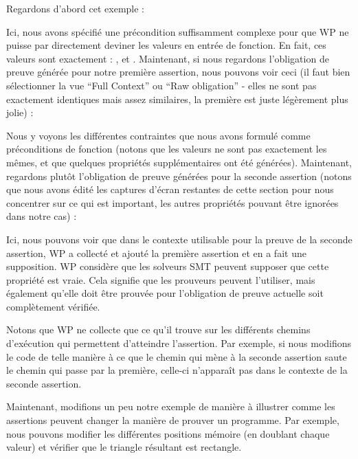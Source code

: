 


Regardons d'abord cet exemple :





Ici, nous avons spécifié une précondition suffisamment complexe pour que WP ne
puisse par directement deviner les valeurs en entrée de fonction. En fait, ces
valeurs sont exactement : ,  et
. Maintenant, si nous regardons l'obligation de preuve générée
pour notre première assertion, nous pouvons voir ceci (il faut bien sélectionner
la vue ``Full Context'' ou ``Raw obligation'' - elles ne sont pas exactement
identiques mais assez similaires, la première est juste légèrement plus jolie) :




Nous y voyons les différentes contraintes que nous avons formulé comme préconditions
de fonction (notons que les valeurs ne sont pas exactement les mêmes, et que quelques
propriétés supplémentaires ont été générées). Maintenant, regardons plutôt
l'obligation de preuve générées pour la seconde assertion (notons que nous avons
édité les captures d'écran restantes de cette section pour nous concentrer sur ce
qui est important, les autres propriétés pouvant être ignorées dans notre cas) :




Ici, nous pouvons voir que dans le contexte utilisable pour la preuve de la seconde
assertion, WP a collecté et ajouté la première assertion et en a fait une supposition.
WP considère que les solveurs SMT peuvent supposer que cette propriété est vraie.
Cela signifie que les prouveurs peuvent l'utiliser, mais également qu'elle doit être
prouvée pour l'obligation de preuve actuelle soit complètement vérifiée.


Notons que WP ne collecte que ce qu'il trouve sur les différents chemins d'exécution
qui permettent d'atteindre l'assertion. Par exemple, si nous modifions le code de
telle manière à ce que le chemin qui mène à la seconde assertion saute le chemin qui
passe par la première, celle-ci n'apparaît pas dans le contexte de la seconde assertion.






Maintenant, modifions un peu notre exemple de manière à illustrer comme les
assertions peuvent changer la manière de prouver un programme. Par exemple, nous
pouvons modifier les différentes positions mémoire (en doublant chaque valeur) et
vérifier que le triangle résultant est rectangle.


